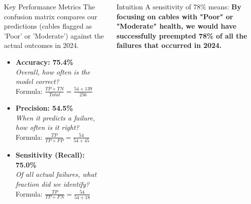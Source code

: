 \documentclass[a4paper,11pt]{article}
\begin{document}
    \begin{columns}[T]
    \begin{column}{0.5\textwidth}
     \begin{block}{Key Performance Metrics}
         The confusion matrix compares our predictions (cables flagged as 'Poor' or 'Moderate') against the actual outcomes in 2024.

         \begin{itemize}
             \item \textbf{Accuracy: 75.4\%} \\
             \textit{\small Overall, how often is the model correct?} \\
             Formula: $\frac{TP+TN}{Total} = \frac{54+139}{256}$
             
             \item \textbf{Precision: 54.5\%} \\
             \textit{\small When it predicts a failure, how often is it right?} \\
             Formula: $\frac{TP}{TP+FP} = \frac{54}{54+45}$
             
             \item \textbf{Sensitivity (Recall): 75.0\%} \\
             \textit{\small Of all actual failures, what fraction did we identify?} \\
             Formula: $\frac{TP}{TP+FN} = \frac{54}{54+18}$
         \end{itemize}
     \end{block}
   \end{column}
    \begin{column}{0.5\textwidth}
        \begin{alertblock}{Intuition}
        A sensitivity of 78\% means: \textbf{By focusing on cables with "Poor" or "Moderate" health, we would have successfully preempted 78\% of all the failures that occurred in 2024.}
        \end{alertblock}
        \vspace{1em}

    \end{column}
\end{columns}
\end{document}
